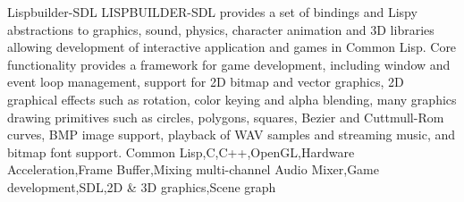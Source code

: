 %
%
%


\begin{projects}
	\project
	{Lispbuilder-SDL}{}
    {}
	{ LISPBUILDER-SDL provides a set of bindings and Lispy abstractions to
	  graphics, sound, physics, character animation and 3D libraries allowing
	  development of interactive application and games in Common Lisp. Core
	  functionality provides a framework for game development, including window
	  and event loop management, support for 2D bitmap and vector graphics, 2D
	  graphical effects such as rotation, color keying and alpha blending, many
	  graphics drawing primitives such as circles, polygons, squares, Bezier and
	  Cuttmull-Rom curves, BMP image support, playback of WAV samples and
	  streaming music, and bitmap font support.}
	{ Common Lisp,C,C++,OpenGL,Hardware Acceleration,Frame Buffer,Mixing multi-channel Audio Mixer,Game development,SDL,2D \& 3D graphics,Scene graph }

\end{projects}

